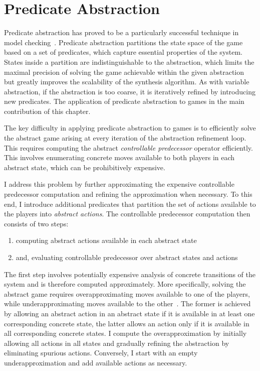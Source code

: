 \section{Predicate Abstraction}

Predicate abstraction has proved to be a particularly successful technique in model checking~\cite{Graf_Saidi_97}. Predicate abstraction partitions the state space of the game based on a set of predicates, which capture essential properties of the system. States inside a partition are indistinguishable to the abstraction, which limits the maximal precision of solving the game achievable within the given abstraction but greatly improves the scalability of the synthesis algorithm. As with variable abstraction, if the abstraction is too coarse, it is iteratively refined by introducing new predicates. The application of predicate abstraction to games in the main contribution of this chapter.

The key difficulty in applying predicate abstraction to games is to efficiently solve the abstract game arising at every iteration of the abstraction refinement loop. This requires computing the abstract \emph{controllable predecessor} operator efficiently. This involves enumerating concrete moves available to both players in each abstract state, which can be prohibitively expensive.  

I address this problem by further approximating the expensive controllable predecessor computation and refining the approximation when necessary. To this end, I introduce additional predicates that partition the set of actions available to the players into \emph{abstract actions}. The controllable predecessor computation then consists of two steps: 

\begin{enumerate}
    \item computing abstract actions available in each abstract state
    \item and, evaluating controllable predecessor over abstract states and actions
\end{enumerate}

The first step involves potentially expensive analysis of concrete transitions of the system and is therefore computed approximately. More specifically, solving the abstract game requires overapproximating moves available to one of the players, while underapproximating moves available to the other~\cite{Henzinger_JM_03}.  The former is achieved by allowing an abstract action in an abstract state if it is available in at least one corresponding concrete state, the latter allows an action only if it is available in all corresponding concrete states. I compute the overapproximation by initially allowing all actions in all states and gradually refining the abstraction by eliminating spurious actions.  Conversely, I start with an empty underapproximation and add available actions as necessary.

